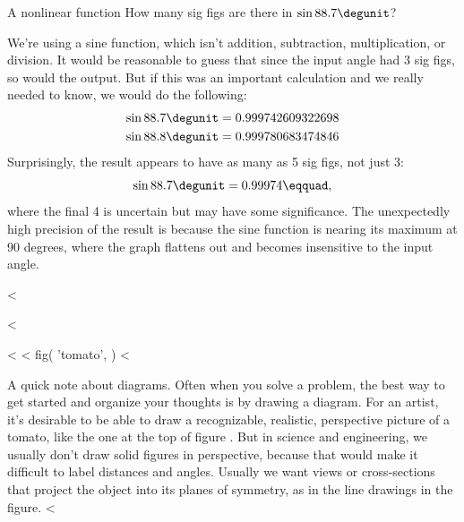 \begin{eg}{A nonlinear function}
\egquestion How many sig figs are there in $\sin 88.7\degunit$?

\eganswer
We're using a sine function, which isn't addition, subtraction, multiplication, or division.
It would be reasonable to guess that since the input angle had 3 sig figs,
so would the output. But if this was an important calculation and we really needed to know,
we would do the following:
\begin{align*}
  \sin 88.7\degunit &= 0.999742609322698 \\
  \sin 88.8\degunit &= 0.999780683474846
\end{align*}
Surprisingly, the result appears to have as many as 5 sig figs, not just 3:
\begin{equation*}
  \sin 88.7\degunit = 0.99974\eqquad,
\end{equation*}
where the final 4 is uncertain but may have some significance.
The unexpectedly high precision of the result is because the sine function is nearing its
maximum at 90 degrees, where the graph flattens out and becomes insensitive to the input angle.
\end{eg}

<%

<%

<%
<%
  fig(
    'tomato',
  )
<%

A quick note about diagrams. Often when you solve a problem, the best way to get started
and organize your thoughts is by drawing a diagram. For an artist, it's desirable to be
able to draw a recognizable, realistic, perspective picture of a tomato, like the one at the top of
figure . But in science and engineering, we usually don't draw solid figures in perspective,
because that would make it difficult to label distances and angles. Usually we want views or cross-sections that project
the object into its planes of symmetry, as in the line drawings in the figure.
<%
